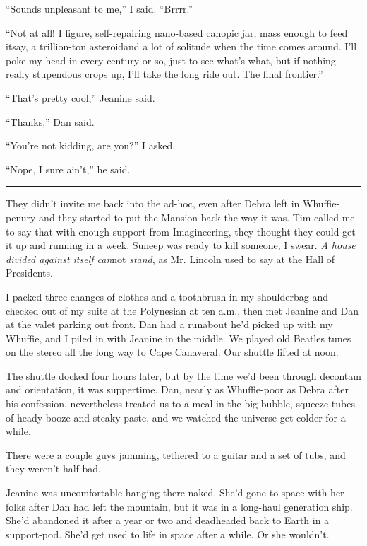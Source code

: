 “Sounds unpleasant to me,” I said. “Brrrr.”

“Not at all! I figure, self-repairing nano-based canopic jar, mass
enough to feed it{\dash}say, a trillion-ton asteroid{\dash}and a lot of
solitude when the time comes around. I'll poke my head in every
century or so, just to see what's what, but if nothing really
stupendous crops up, I'll take the long ride out. The final
frontier.”

“That's pretty cool,” Jeanine said.

“Thanks,” Dan said.

“You're not kidding, are you?” I asked.

“Nope, I sure ain't,” he said.

\begin{center}\rule{1in}{0.4pt}\end{center}

They didn't invite me back into the ad-hoc, even after Debra left
in Whuffie-penury and they started to put the Mansion back the way
it was. Tim called me to say that with enough support from
Imagineering, they thought they could get it up and running in a
week. Suneep was ready to kill someone, I swear.
\emph{A house divided against itself can}not \emph{stand}, as Mr.
Lincoln used to say at the Hall of Presidents.

I packed three changes of clothes and a toothbrush in my
shoulderbag and checked out of my suite at the Polynesian at ten
a.m., then met Jeanine and Dan at the valet parking out front. Dan
had a runabout he'd picked up with my Whuffie, and I piled in with
Jeanine in the middle. We played old Beatles tunes on the stereo
all the long way to Cape Canaveral. Our shuttle lifted at noon.

The shuttle docked four hours later, but by the time we'd been
through decontam and orientation, it was suppertime. Dan, nearly as
Whuffie-poor as Debra after his confession, nevertheless treated us
to a meal in the big bubble, squeeze-tubes of heady booze and
steaky paste, and we watched the universe get colder for a while.

There were a couple guys jamming, tethered to a guitar and a set of
tubs, and they weren't half bad.

Jeanine was uncomfortable hanging there naked. She'd gone to space
with her folks after Dan had left the mountain, but it was in a
long-haul generation ship. She'd abandoned it after a year or two
and deadheaded back to Earth in a support-pod. She'd get used to
life in space after a while. Or she wouldn't.


